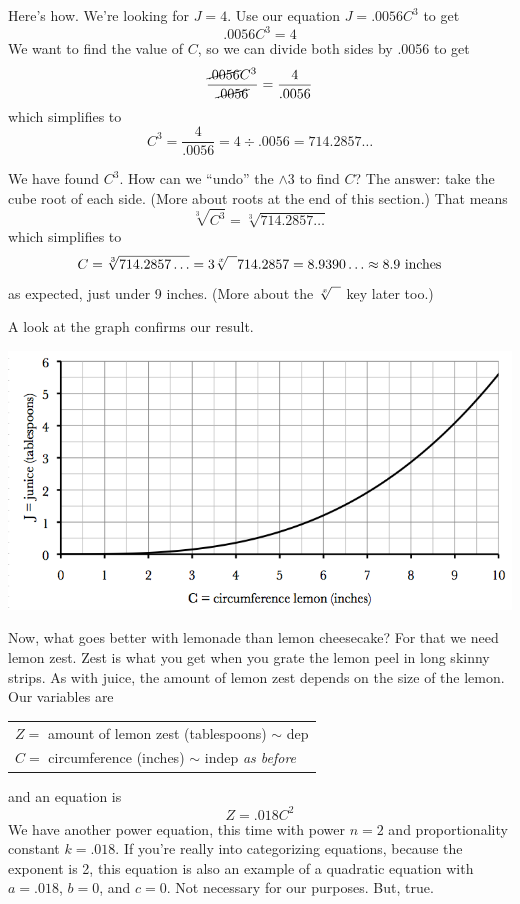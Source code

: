 Here's how.  We're looking for $J = 4$.  Use our equation $J=.0056C^3$ to get 
$$.0056C^3=4$$ 
We want to find the value of $C$, so we can divide both sides by .0056 to get 
$$\frac{\cancel{.0056}C^3}{\cancel{.0056}}=\frac{4}{.0056}$$  
which simplifies to $$C^3 = \frac{4}{.0056}= 4 \div .0056 = 714.2857\ldots$$ 

We have found $C^3$.  How can we ``undo'' the $\wedge 3$ to find $C$?   The answer: take the cube root of each side.  (More about roots at the end of this section.)  That means
 $$\sqrt[3]{C^3} = \sqrt[3]{714.2857\ldots}$$
 which simplifies to 
$$C = \sqrt[3]{714.2857\ldots} =3 \sqrt[x]{\text{\raisebox{.6em}{~\text{  }}}} 714.2857
 = 8.9390\ldots \approx 8.9 \text{ inches}$$  
as expected, just under 9 inches.  (More about the $\sqrt[x]{\text{\raisebox{.6em}{~\text{  }}}}$ key later too.)

A look at the graph confirms our result.
\begin{center}
 {\includegraphics [width = 6in] {lemonade.png}}
\end{center}

Now, what goes better with lemonade than lemon cheesecake?  For that we need lemon zest.  Zest is what you get when you grate the lemon peel in long skinny strips.  As with juice, the amount of lemon zest depends on the size of the lemon.  Our variables are
\begin{center}
\begin{tabular} {l} 
$Z=$ amount of lemon zest (tablespoons) $\sim$ dep \\
$C= $ circumference (inches) $\sim$ indep  \quad \emph{as before}\\ 
\end{tabular}
\end{center}
and an equation is $$Z=.018C^2$$ 
We have another power equation, this time with power $n=2$ and proportionality constant $k=.018$.  If you're really into categorizing equations, because the exponent is 2, this equation is also an example of a quadratic equation with $a=.018$, $b = 0$, and $c=0$.  Not necessary for our purposes.  But, true.


